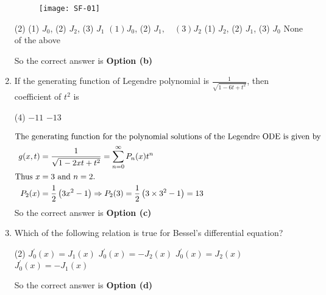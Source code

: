 \begin{enumerate}[label=\color{ocre}\textbf{\arabic*.}]
\begin{figure}[H]
	\centering
	\texttt{[image: SF-01]}
\end{figure}
 \begin{tasks}(2)
	\task[\textbf{a.}](1) $J_{0}$,
	(2) $J_{2}$, (3) $J_{1}$
	\task[\textbf{b.}]$(1) J_{0}$,
	(2) $J_{1}, \quad(3) J_{2}$
	\task[\textbf{c.}](1) $J_{2}$,
	(2) $J_{1}$,
	(3) $J_{0}$
	\task[\textbf{d.}] None of the above
\end{tasks}
\begin{answer}
	So the correct answer is \textbf{Option (b)}
\end{answer}
\item If the generating function of Legendre polynomial is $\frac{1}{\sqrt{1-6 t+t^{2}}}$, then coefficient of $t^{2}$ is
 \begin{tasks}(4)
	\task[\textbf{b.}]$-11$
	\task[\textbf{d.}] $-13$
\end{tasks}
\begin{answer}
	\begin{align*}
	\intertext{The generating function for the polynomial solutions of the Legendre ODE is given by}
	g(x, t)&=\frac{1}{\sqrt{1-2 x t+t^{2}}}=\sum_{n=0}^{\infty} P_{n}(x) t^{n}\\
	\text{Thus }x&=3\text{ and }n=2.\\
	P_{2}(x)&=\frac{1}{2}\left(3 x^{2}-1\right) \Rightarrow P_{2}(3)=\frac{1}{2}\left(3 \times 3^{2}-1\right)=13
	\end{align*}
		So the correct answer is \textbf{Option (c)}
\end{answer}
\item Which of the following relation is true for Bessel's differential equation?
 \begin{tasks}(2)
	\task[\textbf{a.}]$J_{0}^{\prime}(x)=J_{1}(x)$
	\task[\textbf{b.}]$J_{0}^{\prime}(x)=-J_{2}(x)$
	\task[\textbf{c.}]$J_{0}^{\prime}(x)=J_{2}(x)$
	\task[\textbf{d.}] $J_{0}^{\prime}(x)=-J_{1}(x)$
\end{tasks}
\begin{answer}
	So the correct answer is \textbf{Option (d)}
\end{answer}
\end{enumerate}